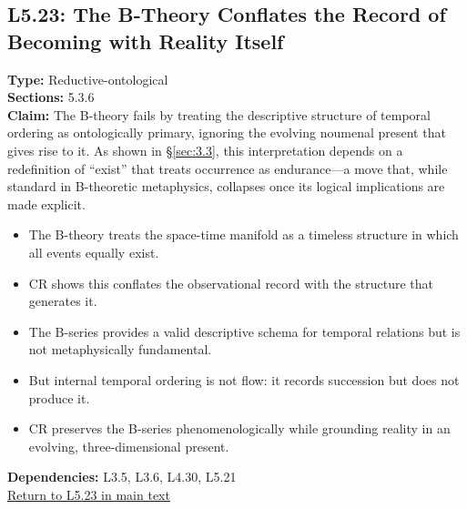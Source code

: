 \documentclass[12pt]{book}
\newcommand{\returnlink}[1]{\hyperref[logic:#1]{Return to #1 in main text}\xspace}
\begin{document}
\subsection*{L5.23: The B-Theory Conflates the Record of Becoming with Reality Itself}
\label{appendix:L5.23}
\textbf{Type:} Reductive-ontological \\
\textbf{Sections:} 5.3.6 \\
\textbf{Claim:} The B-theory fails by treating the descriptive structure of temporal ordering as ontologically primary, ignoring the evolving noumenal present that gives rise to it. As shown in \S\ref{sec:3.3}, this interpretation depends on a redefinition of ``exist'' that treats occurrence as endurance---a move that, while standard in B-theoretic metaphysics, collapses once its logical implications are made explicit.
\begin{itemize}
  \item The B-theory treats the space-time manifold as a timeless structure in which all events equally exist.
  \item CR shows this conflates the observational record with the structure that generates it.
  \item The B-series provides a valid descriptive schema for temporal relations but is not metaphysically fundamental.
  \item But internal temporal ordering is not flow: it records succession but does not produce it.
  \item CR preserves the B-series phenomenologically while grounding reality in an evolving, three-dimensional present.
\end{itemize}
\textbf{Dependencies:} L3.5, L3.6, L4.30, L5.21 \\
\returnlink{L5.23}
\end{document}
